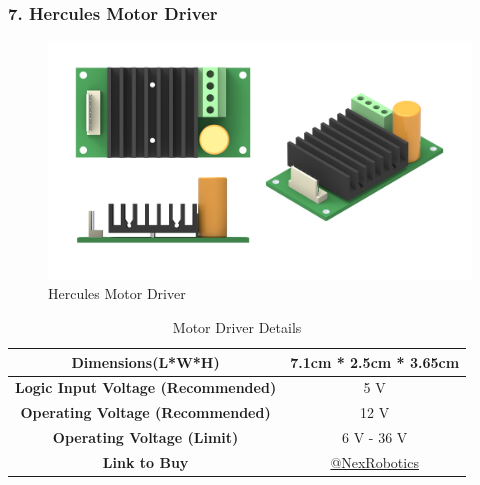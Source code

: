 \documentclass[12pt,a4paper,oneside]{book}
\begin{document}
			\subsubsection*{7. Hercules Motor Driver}
				\begin{figure}[H]
					\centering
					\includegraphics[scale=1]{MOTOR DRIVER FULL}
					\caption{Hercules Motor Driver}	 
				\end{figure}
				\begin{table}[H]
				\centering
				\def\arraystretch{1.5}
					\caption{Motor Driver Details}
					\vspace{0.5cm}
					\begin{tabular}{|c||c|}
					\hline
						\textbf{Dimensions(L*W*H)} & 7.1cm * 2.5cm * 3.65cm\\\hline
						\textbf{Logic Input Voltage (Recommended)} & 5 V\\\hline
						\textbf{Operating Voltage (Recommended)} & 12 V\\\hline
						\textbf{Operating Voltage (Limit)} & 6 V - 36 V\\\hline
						\textbf{Link to Buy} & \href{http://www.nex-robotics.com/products/motor-drivers/hercules-6v-36v-16amp-motor-driver.html}{@NexRobotics}\\\hline
					\end{tabular}
				\end{table}
				\pagebreak
				
\end{document}
